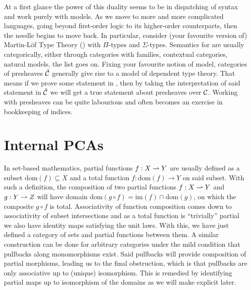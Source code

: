 \documentclass[11pt]{article}
\begin{document}
At a first glance the power of this duality seems to be in dispatching of syntax
and work purely with models. As we move to more and more complicated languages,
going beyond first-order logic to its higher-order counterparts, then the needle
begins to move back. In particular, consider (your favourite version of)
Martin-L\"of Type Theory (\MLTT{}) with \(\Pi\)-types and \(\Sigma\)-types.
Semantics for \MLTT{} are usually categorically, either through categories with
families, contextual categories, natural models, the list goes on. Fixing your
favourite notion of model, categories of presheaves \(\hat{\mathcal{C}}\) generally
give rise to a model of dependent type theory. That means if we prove some
statement in \MLTT{}, then by taking the interpretation of said statement in
\(\hat{\mathcal{C}}\) we will get a true statement about presheaves over \(\mathcal{C}\).
Working with presheaves can be quite labourious and often becomes an exercise
in bookkeeping of indices.



\newpage
\section{Internal PCAs}

In set-based mathematics, partial functions \(f : X \rightharpoonup Y\) are usually
defined as a subset \(\text{dom}(f) \subseteq X\) and a total function
\(f : \text{dom}(f) \to Y\) on said subset. With such a definition, the
composition of two partial functions \(f : X \rightharpoonup Y\) and \(g : Y \rightharpoonup Z\)
will have domain \(\text{dom}(g \circ f) = \text{im}(f) \cap \text{dom}(g)\), on
which the composite \(g \circ f\) is total. Associativity of function
composition comes down to associativity of subset intersections and as a total
function is ``trivially'' partial we also have identity maps satisfying the unit
laws. With this, we have just defined a category of sets and partial functions
between them. A similar construction can be done for arbitrary categories under
the mild condition that pullbacks along monomorphisms exist. Said pullbacks will
provide composition of partial morphisms, leading us to the final obstruction,
which is that pullbacks are only associative up to (unique) isomorphism. This is
remedied by identifying partial maps up to isomorphism of the domains as we will
make explicit later.
\end{document}
